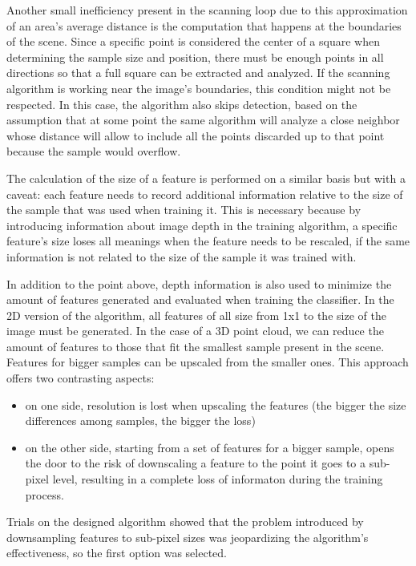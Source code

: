 \documentclass[a4paper,11pt,titlepage]{article}
\begin{document}
Another small inefficiency present in the scanning loop due to this
approximation of an area's average distance is the computation that happens at
the boundaries of the scene. Since a specific point is considered the center of
a square when determining the sample size and position, there must be enough
points in all directions so that a full square can be extracted and analyzed. If
the scanning algorithm is working near the image's boundaries, this condition
might not be respected. In this case, the algorithm also skips detection, based
on the assumption that at some point the same algorithm will analyze a close
neighbor whose distance will allow to include all the points discarded up to
that point because the sample would overflow.

The calculation of the size of a feature is performed on a similar basis but
with a caveat: each feature needs to record additional information relative to
the size of the sample that was used when training it. This is necessary because
by introducing information about image depth in the training algorithm, a
specific feature's size loses all meanings when the feature needs to be
rescaled, if the same information is not related to the size of the sample it
was trained with.

In addition to the point above, depth information is also used to minimize the
amount of features generated and evaluated when training the classifier. In the
2D version of the algorithm, all features of all size from 1x1 to the size of
the image must be generated. In the case of a 3D point cloud, we can reduce the
amount of features to those that fit the smallest sample present in the scene.
Features for bigger samples can be upscaled from the smaller ones. This approach
offers two contrasting aspects:

\begin{itemize}
  \item on one side, resolution is lost when upscaling the features (the bigger the
  size differences among samples, the bigger the loss)
  \item on the other side, starting from a set of features for a bigger sample, opens
  the door to the risk of downscaling a feature to the point it goes to a
  sub-pixel level, resulting in a complete loss of informaton during the training
  process.
\end{itemize}

Trials on the designed algorithm showed that the problem introduced by
downsampling features to sub-pixel sizes was jeopardizing the algorithm's
effectiveness, so the first option was selected.
\end{document}
